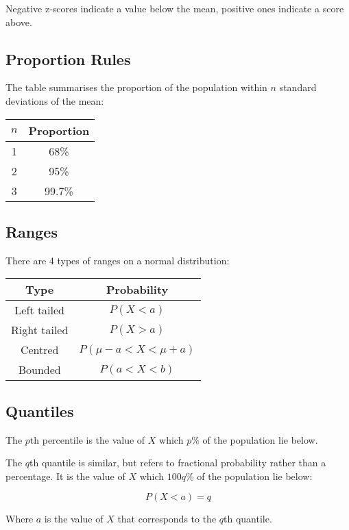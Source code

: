 \documentclass[a4paper,11pt]{article}
\begin{document}
Negative z-scores indicate a value below the mean, positive ones indicate a
score above.


\subsection{Proportion Rules}

The table summarises the proportion of the population within $n$ standard
deviations of the mean:

\begin{center}
\begin{tabular}{c|c}
$n$ & Proportion \\
\hline
1 & 68\% \\
2 & 95\% \\
3 & 99.7\% \\
\end{tabular}
\end{center}


\subsection{Ranges}

There are 4 types of ranges on a normal distribution:

\begin{center}
\begin{tabular}{c|c}
Type & Probability \\
\hline
Left tailed & $P(X < a)$ \\
Right tailed & $P(X > a)$ \\
Centred & $P(\mu - a < X < \mu + a)$ \\
Bounded & $P(a < X < b)$ \\
\end{tabular}
\end{center}


\subsection{Quantiles}

The $p$th percentile is the value of $X$ which $p$\% of the population lie
below.

The $q$th quantile is similar, but refers to fractional probability rather
than a percentage. It is the value of $X$ which $100q$\% of the population lie
below:

$$
P(X < a) = q
$$

Where $a$ is the value of $X$ that corresponds to the $q$th quantile.
\end{document}
